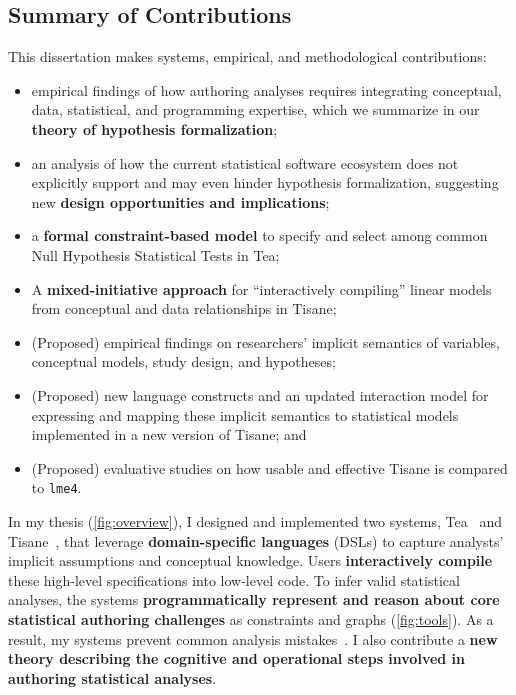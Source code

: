 \subsection{Summary of Contributions} 
This dissertation makes systems, empirical, and methodological contributions:
\begin{itemize} 
    \item empirical findings of how authoring analyses requires integrating
    conceptual, data, statistical, and programming expertise, which we summarize
    in our \textbf{theory of hypothesis formalization}; 
    \item an analysis of how the current statistical software ecosystem does not
    explicitly support and may even hinder hypothesis formalization, suggesting
    new \textbf{design opportunities and implications};
    \item a \textbf{formal constraint-based model} to specify and select among
    common Null Hypothesis Statistical Tests in Tea; 
    \item A \textbf{mixed-initiative approach} for ``interactively compiling''
    linear models from conceptual and data relationships in Tisane; 
    \item (Proposed) empirical findings on researchers' implicit semantics of
    variables, conceptual models, study design, and hypotheses; 
    \item (Proposed) new language constructs and an updated interaction model
    for expressing and mapping these implicit semantics to statistical models
    implemented in a new version of Tisane; and
    \item (Proposed) evaluative studies on how usable and effective Tisane is
    compared to \texttt{lme4}.
\end{itemize}

In my thesis (\autoref{fig:overview}), I designed and implemented two systems,
Tea~\cite{jun2019tea} and Tisane~\cite{jun2022tisane}, that leverage
\textbf{domain-specific languages} (DSLs) to capture analysts' implicit
assumptions and conceptual knowledge. Users \textbf{interactively compile} these
high-level specifications into low-level code. To infer valid statistical
analyses, the systems \textbf{programmatically represent and reason about core
statistical authoring challenges} as constraints and graphs
(\autoref{fig:tools}). As a result, my systems prevent common analysis
mistakes~\cite{jun2019tea,jun2022tisane}. I also contribute a \textbf{new theory
describing the cognitive and operational steps involved in authoring statistical
analyses}.


